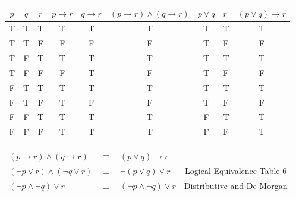 \begin{enumerate}
\begin{table}[h]
\centering
\begin{tabular}{|c|c|c|c|c|c|c|l|c|}
\hline
$p$ & $q$ & $r$ & $p \rightarrow r$ & $q \rightarrow r$ & $(p \rightarrow r) \wedge (q \rightarrow r)$ & $p \vee q$ & $r$ & $(p \vee q) \rightarrow r$ \\ \hline
T   & T   & T   & T                 & T                 & T                                            & T          & T   & T                          \\ \hline
T   & T   & F   & F                 & F                 & F                                            & T          & F   & F                          \\ \hline
T   & F   & T   & T                 & T                 & T                                            & T          & T   & T                          \\ \hline
T   & F   & F   & F                 & T                 & F                                            & T          & F   & F                          \\ \hline
F   & T   & T   & T                 & T                 & T                                            & T          & T   & T                          \\ \hline
F   & T   & F   & T                 & F                 & F                                            & T          & F   & F                          \\ \hline
F   & F   & T   & T                 & T                 & T                                            & F          & T   & T                          \\ \hline
F   & F   & F   & T                 & T                 & T                                            & F          & F   & T                          \\ \hline
\end{tabular}
\end{table}

\begin{table}[h]
\centering
\begin{tabular}{lclc}
$(p \rightarrow r) \wedge (q \rightarrow r)$ & $\equiv$ & $(p \vee q) \rightarrow r$           &                                             \\
$(\neg p \vee r) \wedge (\neg q \vee r)$     & $\equiv$ & $\neg (p \vee q) \vee r$        	     & Logical Equivalence Table 6 \\
$(\neg p \wedge \neg q) \vee r$              	& $\equiv$ & $(\neg p \wedge \neg q) \vee r$ & Distributive and De Morgan                          
\end{tabular}
\end{table}

\end{enumerate}



